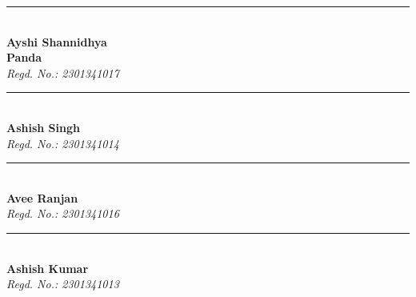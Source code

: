 \vspace{1cm}
\noindent
\begin{minipage}[t]{.24\textwidth}
	\centering
	\vspace{1.5cm}
	\rule{3cm}{0.4pt}\\
	\textbf{Ayshi Shannidhya\\Panda}\\
	\textit{Regd. No.: 2301341017}
\end{minipage}
\begin{minipage}[t]{.24\textwidth}
	\centering
	\vspace{1.5cm}
	\rule{3cm}{0.4pt}\\
	\textbf{Ashish Singh}\\
	\textit{Regd. No.: 2301341014}
\end{minipage}
\begin{minipage}[t]{.24\textwidth}
	\centering
	\vspace{1.5cm}
	\rule{3cm}{0.4pt}\\
	\textbf{Avee Ranjan}\\
	\textit{Regd. No.: 2301341016}
\end{minipage}
\begin{minipage}[t]{.24\textwidth}
	\centering
	\vspace{1.5cm}
	\rule{3cm}{0.4pt}\\
	\textbf{Ashish Kumar}\\
	\textit{Regd. No.: 2301341013}
\end{minipage}
\clearpage
\thispagestyle{empty}
\sitheader

